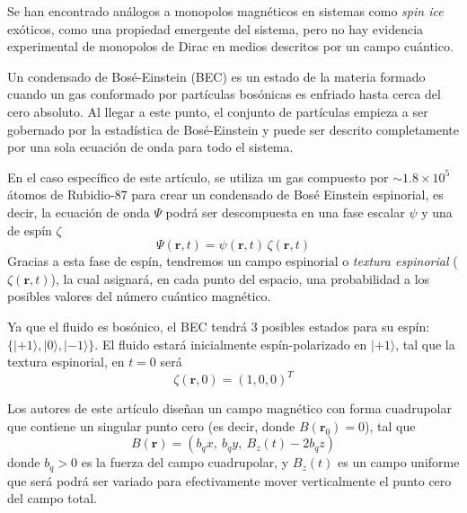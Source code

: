 \documentclass[twocolumn]{article}
\numberwithin{equation}{section}
\newcommand{\0}{\textcolor{gray}{0}}
\newcommand{\rv}{\mathbf{r}}
\begin{document}
	Se han encontrado análogos a monopolos magnéticos en sistemas como \textit{spin ice} exóticos, como una propiedad emergente del sistema, pero no hay evidencia experimental de monopolos de Dirac en medios descritos por un campo cuántico.
	
	Un condensado de Bosé-Einstein (BEC) es un estado de la materia formado cuando un gas conformado por partículas bosónicas es enfriado hasta cerca del cero absoluto. Al llegar a este punto, el conjunto de partículas empieza a ser gobernado por la estadística de Bosé-Einstein y puede ser descrito completamente por una sola ecuación de onda para todo el sistema.
	
	En el caso específico de este artículo, se utiliza un gas compuesto por $\sim 1.8 \times 10^5$ átomos de Rubidio-87 para crear un condensado de Bosé Einstein espinorial, es decir, la ecuación de onda $\Psi$ podrá ser descompuesta en una fase escalar $\psi$ y una de espín $\zeta$
	\begin{equation}
		\Psi(\rv,t) = \psi(\rv,t) \, \zeta(\rv,t)
	\end{equation}
	Gracias a esta fase de espín, tendremos un campo espinorial o \textit{textura espinorial} ($\zeta(\rv,t)$), la cual asignará, en cada punto del espacio, una probabilidad a los posibles valores del número cuántico magnético.
	
	Ya que el fluido es bosónico, el BEC tendrá 3 posibles estados para su espín: $\{|+1\rangle, |0\rangle, |-1\rangle\}$. El fluido estará inicialmente espín-polarizado en $|+1\rangle$, tal que la textura espinorial, en $t = 0$ será
	\begin{equation}
		\zeta(\rv,0) = (1,0,0)^T
	\end{equation}
	
	
	Los autores de este artículo diseñan un campo magnético con forma cuadrupolar que contiene un singular punto cero (es decir, donde $B(\mathbf{r}_0) = 0$), tal que
	\begin{equation}
		B(\mathbf{r}) = \left(b_q x, ~ b_q y, ~ B_z(t) - 2 b_q z\right)
	\end{equation}
	donde $b_q > 0$ es la fuerza del campo cuadrupolar, y $B_z(t)$ es un campo uniforme que será podrá ser variado para efectivamente mover verticalmente el punto cero del campo total.
	
\end{document}
